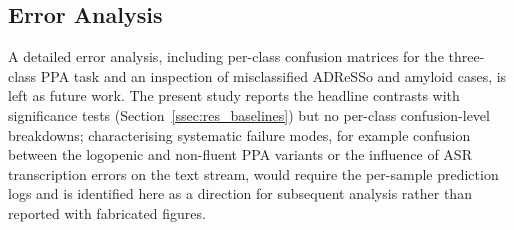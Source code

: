 \subsection{Error Analysis}
\label{ssec:res_error}

A detailed error analysis, including per-class confusion matrices for the three-class PPA task and an inspection of misclassified ADReSSo and amyloid cases, is left as future work. The present study reports the headline contrasts with significance tests (Section~\ref{ssec:res_baselines}) but no per-class confusion-level breakdowns; characterising systematic failure modes, for example confusion between the logopenic and non-fluent PPA variants or the influence of ASR transcription errors on the text stream, would require the per-sample prediction logs and is identified here as a direction for subsequent analysis rather than reported with fabricated figures.
